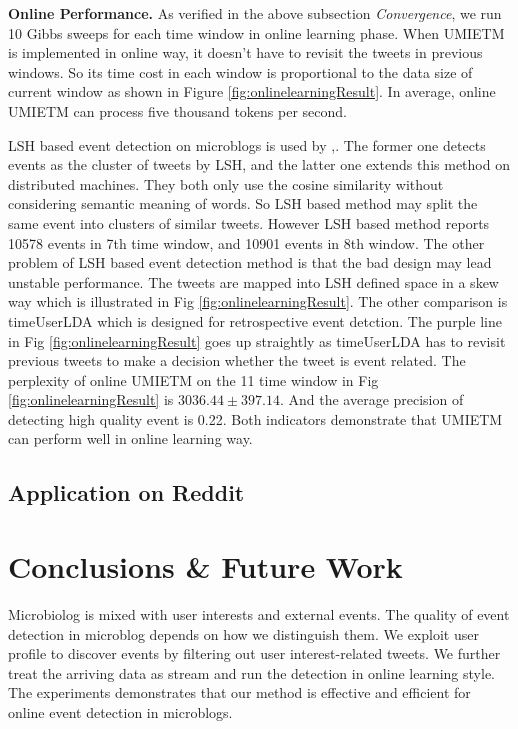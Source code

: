 \documentclass{sig-alternate-05-2015}
\begin{document}
\textbf{Online Performance.}
As verified in the above subsection \textit{Convergence}, we run 10 Gibbs sweeps for each time window in online learning phase.
When UMIETM is implemented in online way, it doesn't have to revisit the tweets in previous windows. 
So its time cost in each window is proportional to the data size of current window  as shown in Figure \ref{fig:onlinelearningResult}.
In average, online UMIETM can process five thousand tokens per second.

LSH based event detection on microblogs is used by \cite{petrovic2010streaming},\cite{mccreadiescalable}. 
The former one detects events as the cluster of tweets by LSH, and the latter one extends this method on distributed machines. 
They both only use the cosine similarity without considering semantic meaning of words. 
So LSH based method may split the same event into clusters of similar tweets.
However LSH based method reports 10578 events in 7th time window, and 10901 events in 8th window. 
The other problem of LSH based event detection method is that the bad design may lead unstable performance. 
The tweets are mapped into LSH defined space in a skew way which is illustrated in Fig \ref{fig:onlinelearningResult}.
The other comparison is timeUserLDA which is designed for retrospective event detction. 
The purple line in Fig \ref{fig:onlinelearningResult} goes up straightly as timeUserLDA has to revisit previous tweets to make a decision whether the tweet is event related. 
The perplexity of online UMIETM on the 11 time window in Fig \ref{fig:onlinelearningResult} is \(3036.44\pm397.14\). 
And the average precision of detecting high quality event is 0.22.
Both indicators demonstrate that UMIETM can perform well in online learning way. 
\subsection{Application on Reddit}

\section{Conclusions \& Future Work}
Microbiolog is mixed with user interests and external events.
The quality of event detection in microblog depends on how we distinguish them.
We exploit user profile to discover events by filtering out user interest-related tweets.
We further treat the arriving data as stream and run the detection in online learning style.
The experiments demonstrates that our method is effective and efficient for online event detection in microblogs.
\end{document}
